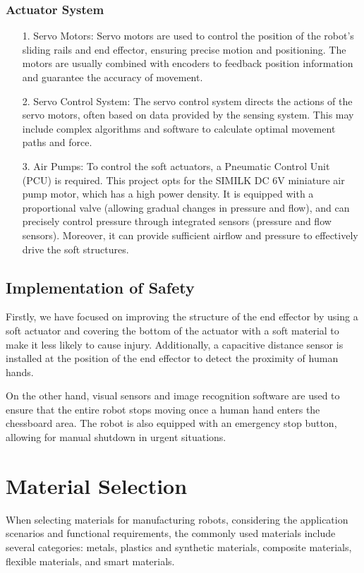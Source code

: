 \documentclass[10pt, a4paper, twocolumn]{article}
\begin{document}
\subsubsection{{Actuator System}}
\begin{itemize}
    \item [1.] Servo Motors: Servo motors are used to control the position of the robot's sliding rails and end effector, ensuring precise motion and positioning. The motors are usually combined with encoders to feedback position information and guarantee the accuracy of movement.
    \item [2.] Servo Control System: The servo control system directs the actions of the servo motors, often based on data provided by the sensing system. This may include complex algorithms and software to calculate optimal movement paths and force.
    \item [3.] Air Pumps: To control the soft actuators, a Pneumatic Control Unit (PCU) is required. This project opts for the SIMILK DC 6V miniature air pump motor, which has a high power density. It is equipped with a proportional valve (allowing gradual changes in pressure and flow), and can precisely control pressure through integrated sensors (pressure and flow sensors). Moreover, it can provide sufficient airflow and pressure to effectively drive the soft structures.
\end{itemize}

\subsection{Implementation of Safety}
Firstly, we have focused on improving the structure of the end effector by using a soft actuator and covering the bottom of the actuator with a soft material to make it less likely to cause injury. Additionally, a capacitive distance sensor is installed at the position of the end effector to detect the proximity of human hands.

On the other hand, visual sensors and image recognition software are used to ensure that the entire robot stops moving once a human hand enters the chessboard area. The robot is also equipped with an emergency stop button, allowing for manual shutdown in urgent situations.

\section{Material Selection}
When selecting materials for manufacturing robots, considering the application scenarios and functional requirements, the commonly used materials include several categories: metals, plastics and synthetic materials, composite materials, flexible materials, and smart materials.
\end{document}
